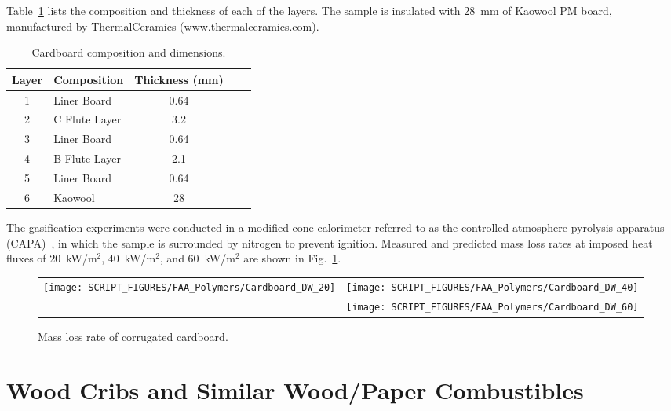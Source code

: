 \noindent Table~\ref{Dimensions_Cardboard} lists the composition and thickness of each of the layers. The sample is insulated with 28~mm of Kaowool PM board, manufactured by ThermalCeramics (www.thermalceramics.com).
\begin{table}[h!]
\caption[Cardboard composition and dimensions]{Cardboard composition and dimensions.}
\begin{center}
\begin{tabular}{|c|l|c|l|l|}
\hline
Layer	  & Composition   & Thickness (mm) \\ \hline \hline
1	      & Liner Board	  & 0.64       \\ \hline
2	      & C Flute Layer & 3.2        \\ \hline
3	      & Liner Board	  & 0.64       \\ \hline
4	      & B Flute Layer & 2.1        \\ \hline
5	      & Liner Board	  & 0.64       \\ \hline
6	      & Kaowool	      & 28         \\ \hline
\end{tabular}
\end{center}
\label{Dimensions_Cardboard}
\end{table}
The gasification experiments were conducted in a modified cone calorimeter referred to as the controlled atmosphere pyrolysis apparatus (CAPA)~\cite{Semmes:IAFSS11}, in which the sample is surrounded by nitrogen to prevent ignition. Measured and predicted mass loss rates at imposed heat fluxes of 20~kW/m$^2$, 40~kW/m$^2$, and 60~kW/m$^2$ are shown in Fig.~\ref{MLR_Cardboard}.

\begin{figure}[h!]
\begin{tabular*}{\textwidth}{l@{\extracolsep{\fill}}r}
\texttt{[image: SCRIPT\_FIGURES/FAA\_Polymers/Cardboard\_DW\_20]} &
\texttt{[image: SCRIPT\_FIGURES/FAA\_Polymers/Cardboard\_DW\_40]} \\
 & \texttt{[image: SCRIPT\_FIGURES/FAA\_Polymers/Cardboard\_DW\_60]}
\end{tabular*}
\caption[Mass loss rate of corrugated cardboard]{Mass loss rate of corrugated cardboard.}
\label{MLR_Cardboard}
\end{figure}


\clearpage

\section{Wood Cribs and Similar Wood/Paper Combustibles}

